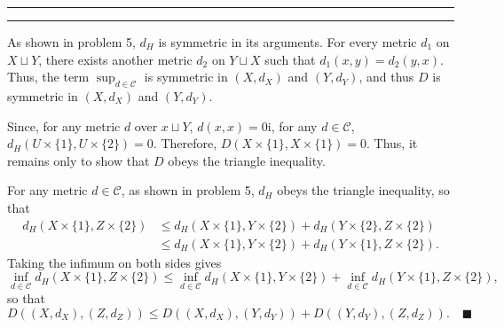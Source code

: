 \documentclass[11pt]{article}
\newcounter{questionCounter}
\newcounter{partCounter}[questionCounter]
\newenvironment{question}[2][\arabic{questionCounter}]{%
    \setcounter{partCounter}{0}%
    \vspace{.25in} \hrule \vspace{0.5em}%
        \noindent{\bf #2}%
    \vspace{0.8em} \hrule \vspace{.10in}%
    \addtocounter{questionCounter}{1}%
}{}
\newcommand{\mqed}{\quad \blacksquare}
\begin{document}
\begin{question}{Problem 6}
As shown in problem 5, $d_H$ is symmetric in its arguments.
For every metric $d_1$ on $X \sqcup Y$, there exists another metric $d_2$ on
$Y \sqcup X$ such that $d_1(x,y) = d_2(y,x)$. Thus, the term
$\sup_{d \in \mathcal{C}}$ is symmetric in $(X,d_X)$ and $(Y,d_Y)$, and thus
$D$ is symmetric in $(X,d_X)$ and $(Y,d_Y)$.

Since, for any metric $d$ over $x \sqcup Y$, $d(x,x) = 0$i,
for any $d \in \mathcal{C}$, $d_H(U \times \{1\},U \times \{2\}) = 0$.
Therefore, $D(X \times \{1\},X \times \{1\}) = 0$. Thus, it remains only to
show that $D$ obeys the triangle inequality.

For any metric $d \in \mathcal{C}$, as shown in problem 5, $d_H$ obeys the
triangle inequality, so that
\begin{align*}
d_H(X \times \{1\},Z \times \{2\})
 & \leq d_H(X \times \{1\},Y \times \{2\})
   +    d_H(Y \times \{2\},Z \times \{2\}) \\
 & \leq d_H(X \times \{1\},Y \times \{2\})
   +    d_H(Y \times \{1\},Z \times \{2\}).
\end{align*}
Taking the infimum on both sides gives
\[\inf_{d \in \mathcal{C}} d_H(X \times \{1\},Z \times \{2\})
 \leq \inf_{d \in \mathcal{C}} d_H(X \times \{1\},Y \times \{2\})
 +    \inf_{d \in \mathcal{C}} d_H(Y \times \{1\},Z \times \{2\}),
\]
so that 
\[D((X,d_X),(Z,d_Z)) \leq D((X,d_X),(Y,d_Y)) + D((Y,d_Y),(Z,d_Z)). \mqed\]
\end{question}
\end{document}
